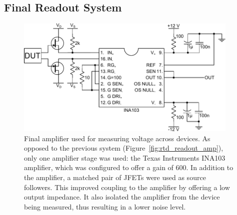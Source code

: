 \subsection{Final Readout System}\label{ssec:final_readout}
\begin{figure}[t]
\begin{center}
\includegraphics[width = 0.95\textwidth]{figures/final_amp}
\caption[Final voltage Readout Amplifier]{Final amplifier used for measuring voltage across devices. As opposed to the previous system (Figure~\ref{fig:rtd_readout_amp}), only one amplifier stage was used: the Texas Instruments INA103 amplifier, which was configured to offer a gain of $600$. In addition to the amplifier, a matched pair of JFETs were used as source followers. This improved coupling to the amplifier by offering a low output impedance. It also isolated the amplifier from the device being measured, thus resulting in a lower noise level.}
\label{fig:finalAmp}
\end{center}
\end{figure}


